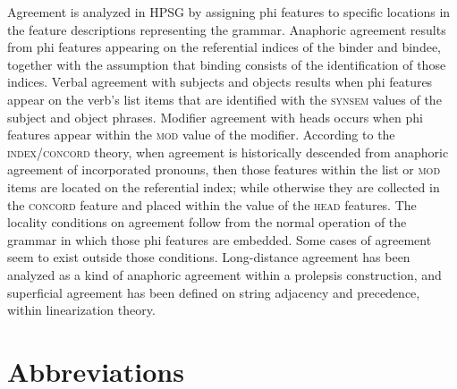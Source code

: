 \documentclass[output=paper
                ,modfonts
                ,nonflat
	        ,collection
	        ,collectionchapter
	        ,collectiontoclongg
 	        ,biblatex
                ,babelshorthands
                ,newtxmath
                ,draftmode
                ,colorlinks, citecolor=brown
]{./langsci/langscibook}
\begin{document}
{Agreement is analyzed in HPSG by assigning phi features to specific locations in the feature descriptions representing the grammar.  Anaphoric agreement results from phi features appearing on the referential indices of the binder and bindee, together with the assumption that binding consists of the identification of those indices.  Verbal agreement with subjects and objects results when phi features appear on the verb's \argst list items that are identified with the \textsc{synsem} values of the subject and object phrases.  Modifier agreement with heads occurs when phi features appear within the \textsc{mod} value of the modifier.  According to the \textsc{index}/\textsc{concord} theory, when agreement is historically descended from anaphoric agreement of incorporated pronouns, then those features within the \argst list or \textsc{mod} items are located  on the referential index; while otherwise they are collected in the \textsc{concord} feature and placed within the value of the \textsc{head} features.   The locality conditions on agreement follow from the normal operation of the grammar in which those phi features are embedded.  Some cases of agreement seem to exist outside those conditions.  Long-distance agreement has been analyzed as a kind of anaphoric agreement within a prolepsis construction, and superficial agreement has been defined on string adjacency and precedence, within linearization theory.  

\section*{Abbreviations}





}
{\sloppy
\printbibliography[heading=subbibliography,notkeyword=this] 
}
\end{document}

